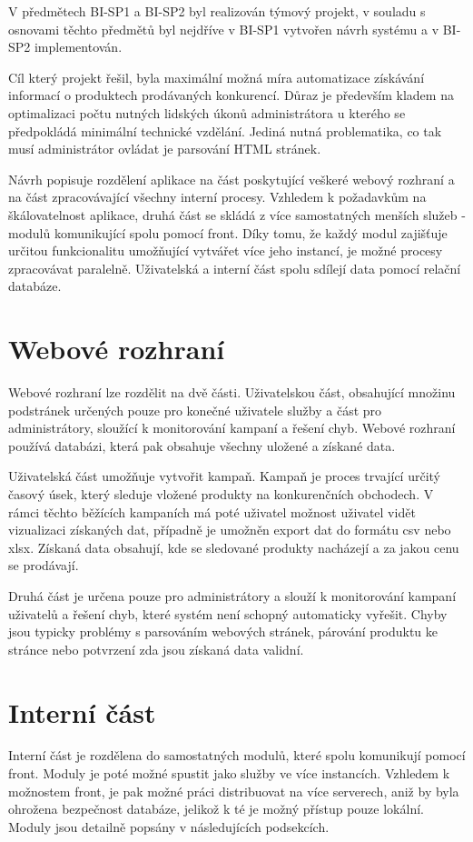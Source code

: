 \documentclass[thesis=B,czech]{FITthesis}[2012/06/26]
\begin{document}
V předmětech BI-SP1 a BI-SP2 byl realizován týmový projekt, v souladu s osnovami těchto předmětů byl nejdříve v BI-SP1 vytvořen návrh
systému a v BI-SP2 implementován.
\par
Cíl který projekt řešil, byla maximální možná míra automatizace získávání informací o produktech prodávaných konkurencí. Důraz je především kladem na optimalizaci počtu nutných lidských úkonů administrátora u kterého se předpokládá minimální technické vzdělání.
Jediná nutná problematika, co tak musí administrátor ovládat je parsování HTML stránek.
\par
Návrh popisuje rozdělení aplikace na část poskytující veškeré webový rozhraní a na část zpracovávající všechny interní procesy.
Vzhledem k požadavkům na škálovatelnost aplikace, druhá část se skládá z více samostatných menších služeb - modulů komunikující
spolu pomocí front. Díky tomu, že každý modul zajišťuje určitou funkcionalitu umožňující vytvářet více jeho instancí, je možné
procesy zpracovávat paralelně. 
Uživatelská a interní část spolu sdílejí data pomocí relační databáze\cite{DB}.

\section{Webové rozhraní}
Webové rozhraní lze rozdělit na dvě části. Uživatelskou část, obsahující množinu podstránek určených pouze pro konečné uživatele
služby a část pro administrátory, sloužící k monitorování kampaní a řešení chyb. Webové rozhraní používá databázi, která pak 
obsahuje všechny uložené a získané data.
\par
Uživatelská část umožňuje vytvořit kampaň. Kampaň je proces trvající určitý časový úsek, který sleduje vložené produkty na konkurenčních
obchodech.
V rámci těchto běžících kampaních má poté uživatel možnost uživatel vidět vizualizaci získaných dat, případně je umožněn export dat do formátu
csv nebo xlsx. Získaná data obsahují, kde se sledované produkty nacházejí a za jakou cenu se prodávají.
\par
Druhá část je určena pouze pro administrátory a slouží k monitorování kampaní uživatelů a řešení chyb, které systém není schopný 
automaticky vyřešit. Chyby jsou typicky problémy s parsováním webových stránek, párování produktu ke stránce nebo potvrzení zda jsou získaná data validní.
\section{Interní část}
Interní část je rozdělena do samostatných modulů, které spolu komunikují pomocí front. Moduly je poté možné spustit jako služby ve více 
instancích. Vzhledem k možnostem front, je pak možné práci distribuovat na více serverech, aniž by byla ohrožena bezpečnost
databáze, jelikož k té je možný přístup pouze lokální. Moduly jsou detailně popsány v následujících podsekcích.
\end{document}
